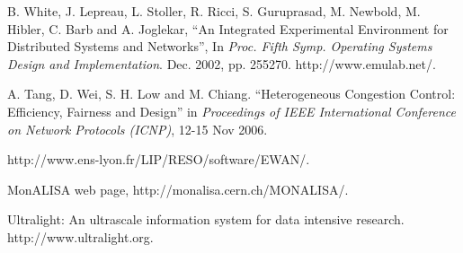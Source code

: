 \documentclass{IEEEtran}
\begin{document}
\begin{thebibliography}{10}
 B. White, J. Lepreau, L. Stoller, R. Ricci, S. Guruprasad, M. Newbold,
M. Hibler, C. Barb and A. Joglekar, ``An Integrated Experimental Environment
for Distributed Systems and Networks'', In {\it Proc. Fifth Symp. Operating
Systems Design and Implementation}. Dec. 2002, pp. 255270.	 http://www.emulab.net/.

A. Tang, D. Wei, S. H. Low and M. Chiang.
``Heterogeneous Congestion Control: Efficiency, Fairness and Design''
in {\it Proceedings of IEEE International Conference on Network Protocols
(ICNP)}, 12-15 Nov 2006.

 http://www.ens-lyon.fr/LIP/RESO/software/EWAN/.

 MonALISA web page, http://monalisa.cern.ch/MONALISA/.

 Ultralight: An ultrascale information system for data intensive research.	 http://www.ultralight.org.

\end{thebibliography}
\end{document}
